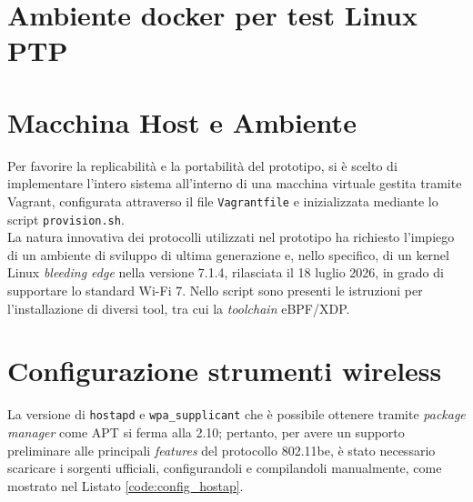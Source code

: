 \documentclass[12pt,a4paper,twoside]{book}
\begin{document}
\renewcommand{\appendixtocname}{Appendici}
\renewcommand{\appendixpagename}{Appendici}
{}
\begin{appendices}
\chapter{Ambiente docker per test Linux PTP}
\label{Appendice:docker_ptp}


\chapter{Macchina Host e Ambiente}
\label{Appendice:host-ambiente}
Per favorire la replicabilità e la portabilità del prototipo, si è scelto di implementare l'intero sistema all'interno di una macchina virtuale gestita tramite Vagrant, configurata attraverso il file \texttt{Vagrantfile} e inizializzata mediante lo script \texttt{provision.sh}.
\\
La natura innovativa dei protocolli utilizzati nel prototipo ha richiesto l'impiego di un ambiente di sviluppo di ultima generazione e, nello specifico, di un kernel Linux \textit{bleeding edge} nella versione 7.1.4, rilasciata il 18 luglio 2026, in grado di supportare lo standard Wi-Fi 7. Nello script sono presenti le istruzioni per l'installazione di diversi tool, tra cui la \textit{toolchain} eBPF/XDP.

\chapter{Configurazione strumenti wireless}
\label{Appendice:config-wifi}
La versione di \texttt{hostapd} e \texttt{wpa\_supplicant} che è possibile ottenere tramite \textit{package manager} come APT si ferma alla 2.10; pertanto, per avere un supporto preliminare alle principali \textit{features} del protocollo 802.11be, è stato necessario scaricare i sorgenti ufficiali, configurandoli e compilandoli manualmente, come mostrato nel Listato \ref{code:config_hostap}.



\end{appendices}
\end{document}
